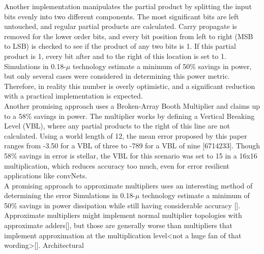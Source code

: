\documentclass[conference]{IEEEtran}
\begin{document}
	\indent Another implementation manipulates the partial product by splitting the input bits evenly into two different components. The most significant bits are left untouched, and regular partial products are calculated. Carry propagate is removed for the lower order bits, and every bit position from left to right (MSB to LSB) is checked to see if the product of any two bits is 1. If this partial product is 1, every bit after and to the right of this location is set to 1. Simulations in 0.18-$\mu$ technology estimate a minimum of 50\% savings in power, but only several cases were considered in determining this power metric. Therefore, in reality this number is overly optimistic, and a significant reduction with a practical implementation is expected. \\
	
	\indent Another promising approach uses a Broken-Array Booth Multiplier and claims up to a 58\% savings in power. The multiplier works by defining a Vertical Breaking Level (VBL), where any partial products to the right of this line are not calculated. Using a world length of 12, the mean error proposed by this paper ranges from -3.50 for a VBL of three to -789 for a VBL of nine [6714233]. Though 58\% savings in error is stellar, the VBL for this scenario was set to 15 in a 16x16 multiplication, which reduces accuracy too much, even for error resilient applications like convNets. \\ 

	\indent A promising approach to approximate multipliers uses an interesting method of determining the error Simulations in 0.18-$\mu$ technology estimate a minimum of 50\% savings in power dissipation while still having considerable accuracy [].\\
	\indent Approximate multipliers might implement normal multiplier topologies with approximate adders[], but those are generally worse than multipliers that implement approximation at the multiplication level<not a huge fan of that wording>[]. Architectural \\
\end{document}
